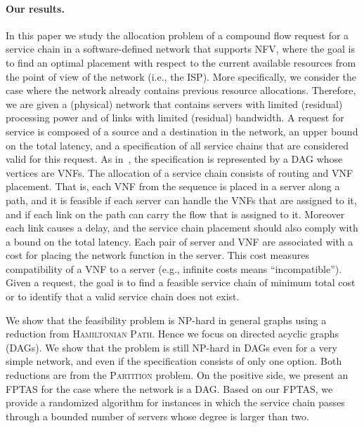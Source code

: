 \documentclass[runningheads]{llncs}
\begin{document}
\paragraph*{\bf Our results.}
%
In this paper we study the allocation problem of a compound flow
request for a service chain in a software-defined network that
supports NFV, where the goal is to find an optimal placement with
respect to the current available resources from the point of view of
the network (i.e., the ISP).
%
More specifically, we consider the case where the network already
contains previous resource allocations.  Therefore, we are given a
(physical) network that contains servers with limited (residual)
processing power and of links with limited (residual) bandwidth.
%
A request for service is composed of a source and a destination in the
network, an upper bound on the total latency, and a specification of
all service chains that are considered valid for this request.  As
in~\cite{EMP16}, the specification is represented by a DAG whose
vertices are VNFs.
%
The allocation of a service chain consists of routing and VNF
placement.  That is, each VNF from the sequence is placed in a server
along a path, and it is feasible if each server can handle the VNFs
that are assigned to it, and if each link on the path can carry the
flow that is assigned to it.  Moreover each link causes a delay, and
the service chain placement should also comply with a bound on the
total latency.
%
Each pair of server and VNF are associated with a cost for placing the
network function in the server.  This cost measures compatibility of a
VNF to a server (e.g., infinite costs means ``incompatible'').  Given
a request, the goal is to find a feasible service chain of minimum
total cost or to identify that a valid service chain does not exist.

We show that the feasibility problem is NP-hard in general graphs
using a reduction from \textsc{Hamiltonian Path}.  Hence we focus on
directed acyclic graphs (DAGs).  We show that the problem is still
NP-hard in DAGs even for a very simple network, and even if the
specification consists of only one option.  Both reductions are from
the \textsc{Partition} problem.
%
On the positive side, we present an FPTAS for the case where the
network is a DAG.  Based on our FPTAS, we provide a randomized
algorithm for instances in which the service chain passes through a
bounded number of servers whose degree is larger than two.


\end{document}
